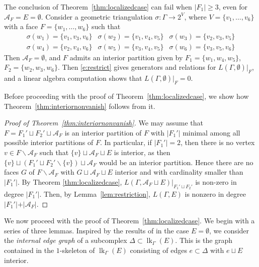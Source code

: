 \documentclass[ALCO, Unicode,published]{cedram}
\DeclareMathOperator{\lk}{lk}
\begin{document}
\begin{example}\label{example:nonrestriction}
The conclusion of Theorem~\ref{thm:localizedcase} can fail when $\vert F_1 \vert \ge 3$, even for $\mathcal{A}_F = E = \emptyset$.  Consider a geometric triangulation $\sigma \colon \Gamma \to 2^V$, where $V = \{v_1, \ldots, v_6 \}$ with a face $F = \{w_1, \ldots, w_6\}$ such that 
\[
\begin{array}{lll}
\sigma(w_1) = \{ v_1, v_3, v_6 \} & \sigma(w_2) = \{ v_1, v_4, v_5 \} & \sigma(w_3) = \{ v_2, v_3, v_5 \} \\
\sigma(w_4) = \{ v_2, v_4, v_6 \} & \sigma(w_5) = \{ v_3, v_4, v_5 \} & \sigma(w_6) = \{ v_3, v_5, v_6 \}
\end{array}
\]
Then $\mathcal{A}_F = \emptyset$, and $F$ admits an interior partition given by $F_1 = \{w_1, w_4, w_5\}$, $F_2 = \{w_2, w_3, w_6\}$. Then \eqref{e:restrict} gives generators and relations for $L(\Gamma, \emptyset)|_{F}$, and a linear algebra computation shows that $L(\Gamma, \emptyset)|_{F} = 0$. 
\end{example}

Before proceeding with the proof of Theorem~\ref{thm:localizedcase}, we show how Theorem~\ref{thm:interiornonvanish} follows from it. 

\begin{proof}[Proof of Theorem~\ref{thm:interiornonvanish}]
We may assume that $F = F_1' \sqcup F_2' \sqcup \mathcal{A}_F$ is an interior partition of $F$ with $\vert F_1' \vert$ minimal among all possible interior partitions of $F$. In particular, if $\vert F_1' \vert = 2$, then there is no vertex $v \in F  \smallsetminus \mathcal{A}_F$ such that $\{v\} \sqcup \mathcal{A}_F \sqcup E$ is interior, as then $\{v\} \sqcup (F_1' \sqcup F_2' \smallsetminus \{v\}) \sqcup \mathcal{A}_F$ would be an interior partition. Hence there are no faces $G$ of $F \smallsetminus \mathcal{A}_F$ with $G \sqcup \mathcal{A}_F \sqcup E$ interior and with cardinality smaller than $\vert F_1' \vert$. 
By Theorem \ref{thm:localizedcase}, $L(\Gamma, \mathcal{A}_F \sqcup E)|_{F_1' \sqcup F_2'}$ is non-zero in degree $\vert F_1' \vert$. Then, by Lemma~\ref{lem:restriction},  $L(\Gamma, E)$ is nonzero in degree $\vert F_1' \vert + \vert \mathcal{A}_F \vert$.
\end{proof}

We now proceed with the proof of Theorem~\ref{thm:localizedcase}. We begin with a series of three lemmas. Inspired by the results of \cite{dMGPSS20} in the case $E = \emptyset$, we consider the \emph{internal edge graph} of a subcomplex $\Delta \subset \lk_{\Gamma}(E)$. This is the graph contained in the $1$-skeleton of $\lk_{\Gamma}(E)$ consisting of edges $e \subset \Delta$ with $e \sqcup E$ interior. 
\end{document}
